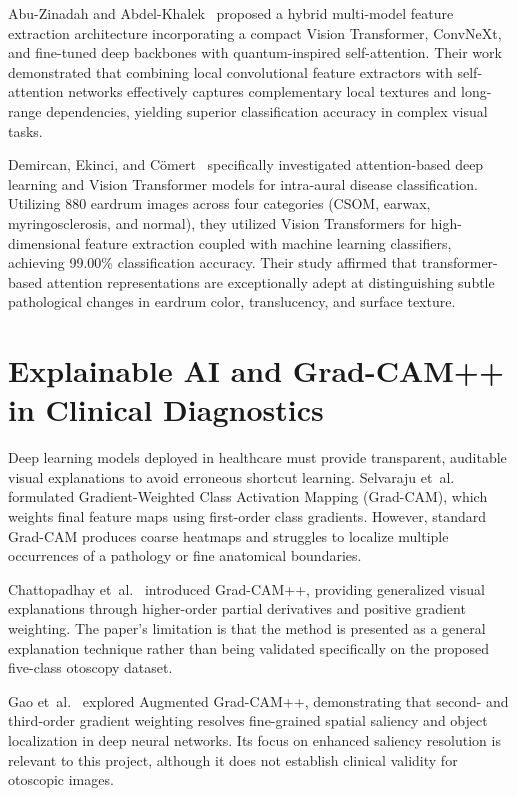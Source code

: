\documentclass[12pt,a4paper]{report}
\renewcommand{\textbf}[1]{#1}
\begin{document}
Abu-Zinadah and Abdel-Khalek~\cite{ref_abuzinadah2026_attention} proposed a hybrid multi-model feature extraction architecture incorporating a compact Vision Transformer, ConvNeXt, and fine-tuned deep backbones with quantum-inspired self-attention. Their work demonstrated that combining local convolutional feature extractors with self-attention networks effectively captures complementary local textures and long-range dependencies, yielding superior classification accuracy in complex visual tasks.

Demircan, Ekinci, and C{\"o}mert~\cite{ref_demircan2025_attention} specifically investigated attention-based deep learning and Vision Transformer models for intra-aural disease classification. Utilizing 880 eardrum images across four categories (CSOM, earwax, myringosclerosis, and normal), they utilized Vision Transformers for high-dimensional feature extraction coupled with machine learning classifiers, achieving 99.00\% classification accuracy. Their study affirmed that transformer-based attention representations are exceptionally adept at distinguishing subtle pathological changes in eardrum color, translucency, and surface texture.

\section{Explainable AI and Grad-CAM++ in Clinical Diagnostics}
Deep learning models deployed in healthcare must provide transparent, auditable visual explanations to avoid erroneous shortcut learning. Selvaraju et~al.~\cite{ref_selvaraju2017_gradcam} formulated Gradient-Weighted Class Activation Mapping (Grad-CAM), which weights final feature maps using first-order class gradients. However, standard Grad-CAM produces coarse heatmaps and struggles to localize multiple occurrences of a pathology or fine anatomical boundaries.

Chattopadhay et~al.~\cite{ref_chattopadhay2018_gradcampp} introduced \textbf{Grad-CAM++}, providing generalized visual explanations through higher-order partial derivatives and positive gradient weighting. The paper's limitation is that the method is presented as a general explanation technique rather than being validated specifically on the proposed five-class otoscopy dataset.

Gao et~al.~\cite{ref_gao2023_augmented_gradcampp} explored Augmented Grad-CAM++, demonstrating that second- and third-order gradient weighting resolves fine-grained spatial saliency and object localization in deep neural networks. Its focus on enhanced saliency resolution is relevant to this project, although it does not establish clinical validity for otoscopic images.
\end{document}
